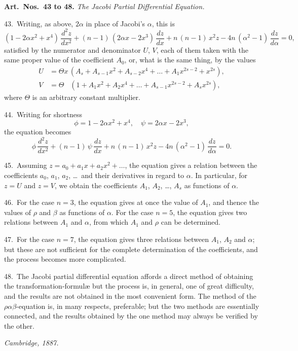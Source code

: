 \documentclass[12pt,a4paper]{article}
\theoremstyle{definition}
\begin{document}
\newpage
\noindent\textbf{Art.\ Nos.\ 43 to 48.} \textit{The Jacobi Partial Differential Equation.}

43.\ Writing, as above, $2\alpha$ in place of Jacobi's $\alpha$, this is
\[
(1 - 2\alpha x^2 + x^4)\, \frac{d^2 z}{dx^2}
+ (n - 1)\, (2\alpha x - 2x^3)\, \frac{dz}{dx}
+ n\, (n - 1)\, x^2 z - 4n\, (\alpha^2 - 1)\, \frac{dz}{d\alpha} = 0,
\]
satisfied by the numerator and denominator $U$, $V$, each of them taken with the
same proper value of the coefficient $A_0$, or, what is the same thing, by the values
\begin{align*}
U &= \Theta x\, (A_s + A_{s-1} x^2 + A_{s-2} x^4 + \ldots + A_1 x^{2s-2} + x^{2s}),\\
V &= \Theta \phantom{x}\; (1 + A_1 x^2 + A_2 x^4 + \ldots + A_{s-1} x^{2s-2} + A_s x^{2s}),
\end{align*}
where $\Theta$ is an arbitrary constant multiplier.

44.\ Writing for shortness
\[
\phi = 1 - 2\alpha x^2 + x^4, \quad \psi = 2\alpha x - 2x^3,
\]
the equation becomes
\[
\phi \, \frac{d^2 z}{dx^2} + (n - 1)\, \psi \, \frac{dz}{dx} + n\, (n - 1)\, x^2 z - 4n\, (\alpha^2 - 1)\, \frac{dz}{d\alpha} = 0.
\]

45.\ Assuming $z = a_0 + a_1 x + a_2 x^2 + \ldots$, the equation gives a relation between the
coefficients $a_0$, $a_1$, $a_2$, \ldots\ and their derivatives in regard to $\alpha$. In particular, for $z = U$
and $z = V$, we obtain the coefficients $A_1$, $A_2$, \ldots, $A_s$ as functions of $\alpha$.

46.\ For the case $n = 3$, the equation gives at once the value of $A_1$, and thence
the values of $\rho$ and $\beta$ as functions of $\alpha$. For the case $n = 5$, the equation gives
two relations between $A_1$ and $\alpha$, from which $A_1$ and $\rho$ can be determined.

47.\ For the case $n = 7$, the equation gives three relations between $A_1$, $A_2$ and $\alpha$;
but these are not sufficient for the complete determination of the coefficients, and the
process becomes more complicated.

48.\ The Jacobi partial differential equation affords a direct method of obtaining the
transformation-formul\ae\; but the process is, in general, one of great difficulty, and the
results are not obtained in the most convenient form. The method of the $\rho\alpha\beta$-equation
is, in many respects, preferable; but the two methods are essentially connected, and
the results obtained by the one method may always be verified by the other.

\begin{flushright}
\textit{Cambridge, 1887.}
\end{flushright}
\end{document}
